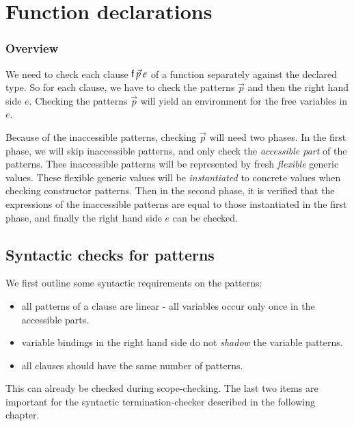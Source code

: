 \section{Function declarations}

\newcommand\checkcl[2]{#1\:\mathbf{checkcl}\:#2}
\newcommand\checkp[5]{(#1)\vdash#2\:\mathbf{chkP}\:#3\Rightarrow (#4),#5}
\newcommand\checkps[5]{(#1)\vdash#2\:\mathbf{chkPs}\:#3\Rightarrow (#4),#5}
\newcommand\checkinacc[4]{(#1)\vdash#2\:\mathbf{checkinacc}\:#3 : #4}
\newcommand\unify[5]{#1,#2\vdash#3\:\mathbf{inst}\:#4\Rightarrow #5}
\newcommand\unifylist[5]{#1,#2\vdash#3\:\mathbf{inst_{list}}\:#4\Rightarrow #5}


\subsubsection{Overview}
We need to check each clause $\mathsf{f} \: \vec{p} \: e$ of a function separately against the declared type.
So for each clause, we have to check the patterns $\vec{p}$ and then the right hand side $e$.
Checking the patterns $\vec{p}$ will yield an environment for the free variables in $e$.

Because of the inaccessible patterns, checking $\vec{p}$ will need two phases.
In the first phase, we will skip inaccessible patterns, and only check the \emph{accessible part} of the patterns.
Thee inaccessible patterns will be represented by fresh \emph{flexible} generic values.
These flexible generic values will be \emph{instantiated} to concrete values when checking constructor patterns.
Then in the second phase, it is verified that the expressions of the inaccessible patterns are equal to those instantiated in the first phase, and finally the right hand side $e$ can be checked.

\newcommand{\subst}[2]{#1\{#2\}}
\newcommand{\substEnv}[2]{#1\{#2\}}
\newcommand{\compS}[2]{\opn{comp}\:#1\:#2}
\newcommand\ptv[2]{#1\Searrow#2}
\newcommand\ptvx{\opn{p2v}}
\newcommand\pstvs{\opn{p_{s}2v_{s}}}

\subsection{Syntactic checks for patterns}

We first outline some syntactic requirements on the patterns:
\begin{itemize}
\item
all patterns of a clause are linear - all variables occur only once in the accessible parts.
\item
variable bindings in the right hand side do not \emph{shadow} the variable patterns.
\item
all clauses should have the same number of patterns.
\end{itemize}
This can already be checked during scope-checking.
The last two items are important for the syntactic termination-checker described in the following chapter.

